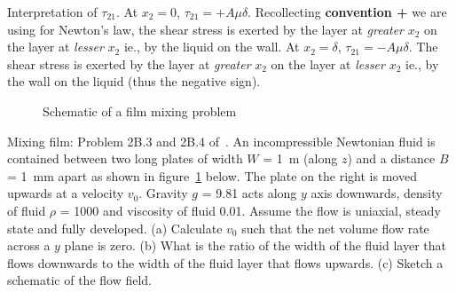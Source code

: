 Interpretation of $\tau_{21}$. At $x_2=0$, $\tau_{21} = + A \mu \delta$. Recollecting {\bf convention +} we are using for Newton's law, the shear stress is exerted by the layer at {\em greater} $x_2$ on the layer at {\em lesser} $x_2$ ie., by the liquid on the wall.
At $x_2=\delta$, $\tau_{21} = - A \mu \delta$. The shear stress is exerted by the layer at {\em greater} $x_2$ on the layer at {\em lesser} $x_2$ ie., by the wall on the liquid (thus the negative sign). 


\begin{figure}[h]
\begin{center}
\end{center}
\caption{Schematic of a film mixing problem}
\label{MixingFilm}
\end{figure}

\begin{question} 
\item Mixing film: Problem 2B.3 and 2B.4 of~\cite{bls}. An incompressible Newtonian fluid is contained between two long plates of width $W$ = \SI{1}{\metre} (along $z$) and  a distance $B$ = \SI{1}{\mm} apart as shown in figure~\ref{MixingFilm} below. The plate on the right is moved upwards at a velocity $v_0$. Gravity $g$ = \SI{9.81}{\mpss} acts along $y$ axis downwards, density of fluid $\rho$ = \SI{1000}{\kgpmc} and viscosity of fluid \SI{0.01}{\pas}. Assume  the flow is uniaxial, steady state and fully developed. (a) Calculate $v_0$ such that the net volume flow rate across a $y$ plane is zero. (b) What is the ratio of the width of the fluid layer that flows downwards to the width of the fluid layer that flows upwards. (c) Sketch a schematic of the flow field.
\end{question}
\begin{solution}[print]
\end{solution}

